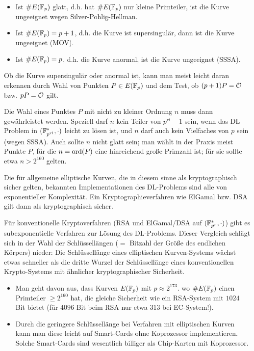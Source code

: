 \begin{bem}
	\begin{itemize}
		\item Ist $\#E(\mathbb{F}_p)$ glatt, d.h. hat $\#E(\mathbb{F}_p)$ nur kleine Primteiler, ist die Kurve ungeeignet wegen Silver-Pohlig-Hellman.
		\item Ist $\#E(\mathbb{F}_p) = p+1$, d.h. die Kurve ist supersingulär, dann ist die Kurve ungeeignet (MOV).
		\item Ist $\#E(\mathbb{F}_p) = p$, d.h. die Kurve anormal, ist die Kurve ungeeignet (SSSA).
	\end{itemize}
	Ob die Kurve supersingulär oder anormal ist, kann man meist leicht daran erkennen durch Wahl von Punkten $P \in E(\mathbb{F}_p)$ und dem Test, ob $(p+1)P = \mathcal{O}$ bzw. $pP = \mathcal{O}$ gilt.
\end{bem}

\begin{bem}
	Die Wahl eines Punktes $P$ mit nicht zu kleiner Ordnung $n$ muss dann gewährleistet werden.
	Speziell darf $n$ kein Teiler von $p^{rl} - 1$ sein, wenn das DL-Problem in $(\mathbb{F}_{p^{rl}}^*,\cdot)$ leicht zu lösen ist, und $n$ darf auch kein Vielfaches von $p$ sein (wegen SSSA).
	Auch sollte $n$ nicht glatt sein; man wählt in der Praxis meist Punkte $P$, für die $n = \operatorname{ord}(P)$ eine hinreichend große Primzahl ist; für sie sollte etwa $n > 2^{160}$ gelten.
\end{bem}

\begin{bem}
	Die für allgemeine elliptische Kurven, die in diesem sinne als kryptographisch sicher gelten, bekannten Implementationen des DL-Problems sind alle von exponentieller Komplexität.
	Ein Kryptographieverfahren wie ElGamal bzw. DSA gilt dann als kryptographisch sicher.
\end{bem}

\begin{bem}
	Für konventionelle Kryptoverfahren (RSA und ElGamal/DSA auf $(\mathbb{F}_{p^r}^*,\cdot)$) gibt es subexponentielle Verfahren zur Lösung des DL-Problems. Dieser Vergleich schlägt sich in der Wahl der Schlüssellängen ($=$ Bitzahl der Größe des endlichen Körpers) nieder:
	Die Schlüssellänge eines elliptischen Kurven-Systems wächst etwas schneller als die dritte Wurzel der Schlüssellänge eines konventionellen Krypto-Systems mit ähnlicher kryptographischer Sicherheit.
\end{bem}

\begin{bem}
	\begin{itemize}
		\item Man geht davon aus, dass Kurven $E(\mathbb{F}_p)$ mit $p \approx 2^{173}$. wo $\#E(\mathbb{F}_p)$ einen Primteiler $\geq 2^{160}$ hat, die gleiche Sicherheit wie ein RSA-System mit $1024$ Bit bietet (für $4096$ Bit beim RSA nur etwa $313$ bei EC-System!).
		\item Durch die geringere Schlüssellänge bei Verfahren mit elliptischen Kurven kann man diese leicht auf Smart-Cards ohne Koprozessor implementieren.
		Solche Smart-Cards sind wesentlich billiger als Chip-Karten mit Koprozessor.
	\end{itemize}
\end{bem}


